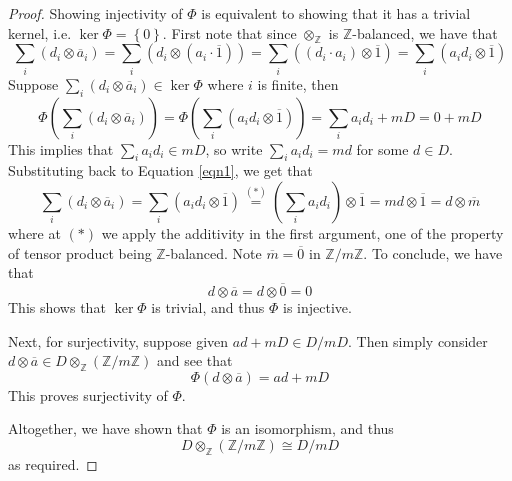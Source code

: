 \documentclass{article}
\theoremstyle{definition}
\newcommand{\Z}{{\mathbb Z}}
\newcommand{\ten}{\otimes_\Z}
\newcommand{\tens}{\otimes}
\renewcommand{\a}{\overline{a}}
\newcommand{\br}[1]{\left(#1\right)}
\newcommand{\sbr}[1]{\left\{#1\right\}}
\newcommand{\func}[2]{#1 \br {#2}}
\begin{document}
\begin{proof}
    Showing injectivity of $\Phi$ is equivalent to showing that it has a trivial kernel, i.e. $\ker \Phi = \sbr{0}$. First note that since $\ten$ is $\Z$-balanced, we have that
    \begin{equation} \label{eqn1}
        \sum_i (d_i \tens \a_i) = \sum_i (d_i\tens (a_i\cdot \overline{1})) = \sum_i ((d_i\cdot a_i) \tens \overline{1}) = \sum_i (a_id_i \tens \overline{1})
    \end{equation}
    Suppose $\sum_i (d_i\tens \a_i)\in \ker \Phi$ where $i$ is finite, then 
    \[\func{\Phi}{\sum_i (d_i\tens \a_i)} = \func{\Phi}{\sum_i (a_id_i\tens \overline 1)} = \sum_i a_id_i + mD = 0+mD\]
    This implies that $\sum_i a_id_i\in mD$, so write $\sum_i a_id_i= md$ for some $d\in D$. Substituting back to Equation \ref{eqn1}, we get that
    \[\sum_{i} (d_i \tens \a_i) = \sum_i (a_id_i \tens \overline 1) \overset{(*)}{=} \br{\sum_i a_id_i} \tens \overline 1 = md \tens \overline 1 = d\tens \overline{m} \]
    where at $(*)$ we apply the additivity in the first argument, one of the property of tensor product being $\Z$-balanced. Note $\overline{m} = \overline{0}$ in $\Z/m\Z$. To conclude, we have that
    \[d\tens \a = d \tens \overline{0} = 0\]
    This shows that $\ker\Phi$ is trivial, and thus $\Phi$ is injective.

    Next, for surjectivity, suppose given $ad + mD\in D/mD$. Then simply consider $d\tens \a\in D\ten (\Z/m\Z)$ and see that
    \[\Phi(d\tens \a) = ad + mD\]
    This proves surjectivity of $\Phi$. 

    Altogether, we have shown that $\Phi$ is an isomorphism, and thus 
    \[D\ten (\Z/m\Z) \cong D/mD\]
    as required.
\end{proof}
\end{document}
